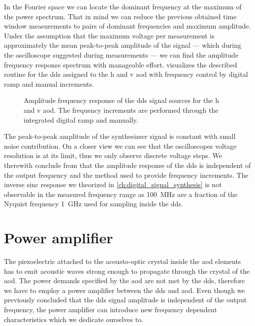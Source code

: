 In the Fourier space we can locate the dominant frequency at the maximum of
the power spectrum. That in mind we can reduce the previous obtained time
window measurements to pairs of dominant frequencies and maximum amplitude.
Under the assumption that the maximum voltage per measurement is approximately
the mean peak-to-peak amplitude of the signal --- which during the
oscilloscope suggested during measurements --- we can find the amplitude
frequency response spectrum with manageable effort.
 visualizes the described routine for the
\gls{dds} assigned to the \gls{h} and \gls{v} \gls{aod} with frequency control
by digital ramp and manual increments.
\begin{figure}[htb]
  \centering
  \begin{adjustbox}{width=\textwidth}
    
  \end{adjustbox}
  \caption{Amplitude frequency response of the \gls{dds} signal sources for
    the \gls{h} and \gls{v} \gls{aod}. The frequency increments
    are performed through the integrated digital ramp and manually.
  }\label{fig:signal_synthesis_response}
\end{figure}
The peak-to-peak amplitude of the synthesizser signal is constant with small
noise contribution. On a closer view we can see that the oscilloscopes voltage
resolution is at its limit, thus we only observe discrete voltage steps.
We therewith conclude from  that the
amplitude response of the \gls{dds} is independent of the output frequency
and the method used to provide frequency increments. The inverse sinc response
we theorized in \cref{ch:digital_signal_synthesis} is not observable in the
measured frequency range as \SI{100}{\mega\hertz} are a fraction of the
Nyquist frequency \SI{1}{\giga\hertz} used for sampling inside the \gls{dds}.

\section{Power amplifier}

The piezoelectric attached to the acousto-optic crystal inside the \gls{aod}
elements has to emit acoustic waves strong enough to propagate through the
crystal of the \gls{aod}. The power demands specified by the \gls{aod} are
not met by the \gls{dds}, therefore we have to employ a power amplifier
between the \gls{dds} and \gls{aod}. Even though we previously concluded that
the \gls{dds} signal amplitude is independent of the output frequency, the
power amplifier can introduce new frequency dependent characteristics which
we dedicate ourselves to.

